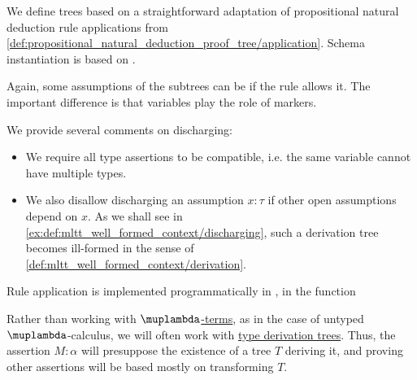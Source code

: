 \begin{definition}
\begin{thmenum}[resume=def:type_derivation_tree]
     We define  trees based on a straightforward adaptation of propositional natural deduction rule applications from \cref{def:propositional_natural_deduction_proof_tree/application}. Schema instantiation is based on .

    Again, some assumptions of the subtrees can be  if the rule allows it. The important difference is that variables play the role of markers.

    We provide several comments on discharging:
    \begin{itemize}
      \item We require all type assertions to be compatible, i.e. the same variable cannot have multiple types.

      \item We also disallow discharging an assumption \( x: \tau \) if other open assumptions depend on \( x \). As we shall see in \cref{ex:def:mltt_well_formed_context/discharging}, such a derivation tree becomes ill-formed in the sense of \cref{def:mltt_well_formed_context/derivation}.
    \end{itemize}
  \end{thmenum}
\end{definition}
\begin{comments}
  \item Rule application is implemented programmatically in \cite{notebook:code}, in the function
  \begin{CodeRefDisplay}
  \end{CodeRefDisplay}
\end{comments}

\begin{remark}\label{rem:type_derivation_tree_focus}
  Rather than working with \hyperref[def:lambda_term]{\( \muplambda \)-terms}, as in the case of untyped \( \muplambda \)-calculus, we will often work with \hyperref[def:type_derivation_tree]{type derivation trees}. Thus, the assertion \( M: \alpha \) will presuppose the existence of a tree \( T \) deriving it, and proving other assertions will be based mostly on transforming \( T \).
\end{remark}

